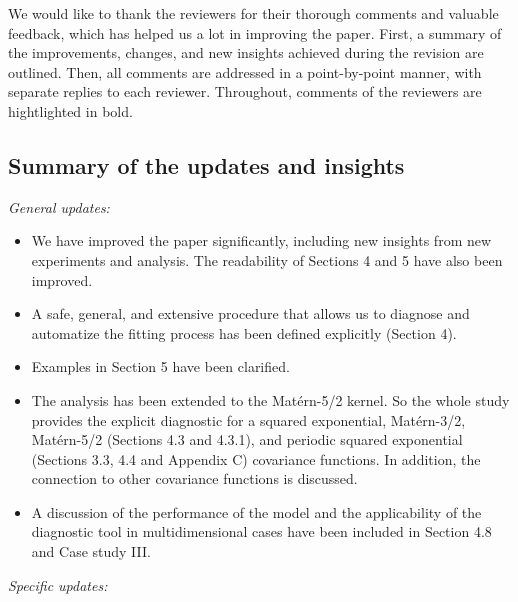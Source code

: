 \documentclass[11pt]{report}
\begin{document}
We would like to thank the reviewers for their thorough comments and valuable feedback, which has helped us a lot in improving the paper. First, a summary of the improvements, changes, and new insights achieved during the revision are outlined. Then, all comments are addressed in a point-by-point manner, with separate replies to each reviewer. 
Throughout, comments of the reviewers are hightlighted in bold.

\noindent \hdashrule{12.5cm}{0.2pt}{2mm 1pt}

\subsection*{Summary of the updates and insights}

\textit{General updates:}

\begin{itemize}

\item We have improved the paper significantly, including new insights from new experiments and analysis. The readability of Sections 4 and 5 have also been improved. 

\item A safe, general, and extensive procedure that allows us to diagnose and automatize the fitting process has been defined explicitly (Section 4). 

\item Examples in Section 5 have been clarified.

\item The analysis has been extended to the Mat\'ern-5/2 kernel. So the whole study provides the explicit diagnostic for a squared exponential, Mat\'ern-3/2, Mat\'ern-5/2 (Sections 4.3 and 4.3.1), and periodic squared exponential (Sections 3.3, 4.4 and Appendix C) covariance functions. In addition, the connection to other covariance functions is discussed.

\item A discussion of the performance of the model and the applicability of the diagnostic tool in multidimensional cases have been included in Section 4.8 and Case study III.

\end{itemize}

\noindent \textit{Specific updates:}
\end{document}
